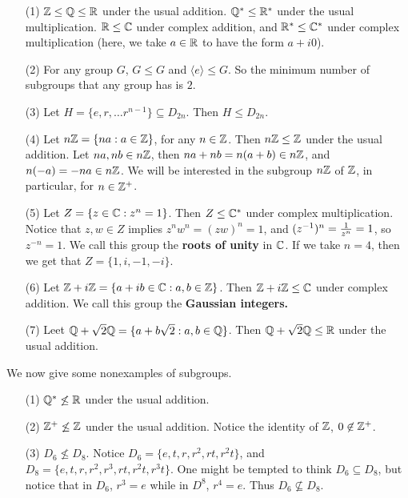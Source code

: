 \begin{example}\label{example_2.1}
  \begin{enumerate}
    \item[(1)] $\mathbb{Z} \leq \mathbb{Q} \leq \mathbb{R}$ under the usual addition.  $\mathbb{Q}^*
      \leq \mathbb{R}^*$ under the usual multiplication. $\mathbb{R} \leq \mathbb{C}$ under
      complex addition, and $\mathbb{R}^* \leq \mathbb{C}^*$ under complex multiplication
      (here, we take $a \in \mathbb{R}$ to have the form  $a+i0$).

    \item[(2)] For any group $G$,  $G \leq G$ and  $\langle e \rangle \leq G$.
      So the minimum number of subgroups that any group has is $2$.

    \item [(3)] Let $H=\{e, r, \dots r^{n-1}\} \subseteq D_{2n}$. Then $H \leq
      D_{2n}$.

    \item[(4)] Let $n\mathbb{Z}=\{na : a \in \mathbb{Z}\}$, for any $n \in \mathbb{Z}$. Then
      $n\mathbb{Z} \leq \mathbb{Z}$ under the usual addition. Let  $na, nb \in n\mathbb{Z}$, then
      $na+nb=n(a+b) \in n\mathbb{Z}$, and $n(-a)=-na \in n\mathbb{Z}$. We will be
      interested in the subgroup $n\mathbb{Z}$ of $\mathbb{Z}$, in particular, for  $n \in
      \mathbb{Z}^+$.

    \item [(5)] Let $Z=\{z \in \mathbb{C} : z^n=1\}$. Then $Z \leq \mathbb{C}^*$ under
      complex multiplication. Notice that  $z,w \in Z$ implies
      $z^nw^n=(zw)^n=1$, and $(z^{-1})^n=\frac{1}{z^n}=1$, so $z^{-n}=1$.
      We call this group the \textbf{roots of unity} in $\mathbb{C}$. If we take
      $n=4$, then we get that  $Z=\{1,i,-1,-i\}$.

    \item[(6)] Let $\mathbb{Z}+i\mathbb{Z}=\{a+ib \in \mathbb{C} : a,b \in \mathbb{Z}\}$. Then $\mathbb{Z}+i\mathbb{Z} \leq
      \mathbb{C}$ under complex addition. We call this group the \textbf{Gaussian
      integers.}

    \item[(7)] Leet $\mathbb{Q}+\sqrt{2}\mathbb{Q}=\{a+b\sqrt{2} : a,b \in \mathbb{Q}\}$. Then
      $\mathbb{Q}+\sqrt{2}\mathbb{Q} \leq \mathbb{R}$ under the usual addition.
  \end{enumerate}
\end{example}

We now give some nonexamples of subgroups.

\begin{example}\label{example_2.2}
  \begin{enumerate}
    \item[(1)] $\mathbb{Q}^* \not\leq \mathbb{R}$ under the usual addition.

    \item[(2)] $\mathbb{Z}^+ \not\leq \mathbb{Z}$ under the usual addition. Notice the
      identity of $\mathbb{Z}$, $0 \not\in \mathbb{Z}^+$.

    \item[(3)] $D_6 \not\leq D_8$. Notice
      $D_6=\{e,t,r,r^2,rt,r^2t\}$, and $D_8=\{e,t,r,r^2,r^3,rt,r^2t,
      r^3t\}$. One might be tempted to think $D_6 \subseteq D_8$, but
      notice that in $D_6$, $r^3=e$ while in  $D^8$,  $r^4=e$. Thus  $D_6
      \not\subseteq D_8$.
  \end{enumerate}
\end{example}
